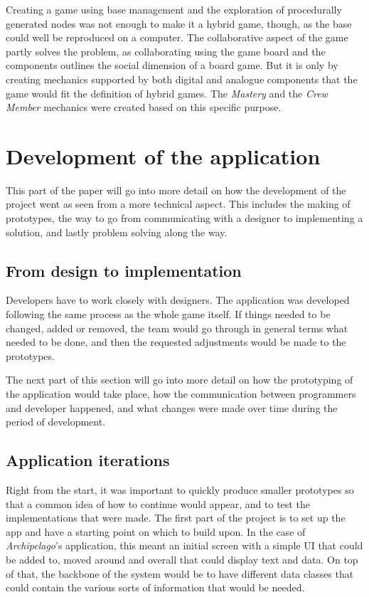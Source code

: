 Creating a game using base management and the exploration of procedurally generated nodes was not enough to make it a hybrid game, though, as the base could well be reproduced on a computer. The collaborative aspect of the game partly solves the problem, as collaborating using the game board and the components outlines the social dimension of a board game. But it is only by creating mechanics supported by both digital and analogue components that the game would fit the definition of hybrid games. The \textit{Mastery} and the \textit{Crew Member} mechanics were created based on this specific purpose.



\section{Development of the application}
This part of the paper will go into more detail on how the development of the project went as seen from a more technical aspect. This includes the making of prototypes, the way to go from communicating with a designer to implementing a solution, and lastly problem solving along the way.

\subsection{From design to implementation}
Developers have to work closely with designers. The application was developed following the same process as the whole game itself. 
If things needed to be changed, added or removed, the team would go through in general terms what needed to be done, and then the requested adjustments would be made to the prototypes.

The next part of this section will go into more detail on how the prototyping of the application would take place, how the communication between programmers and developer happened, and what changes were made over time during the period of development.

\subsection{Application iterations}
Right from the start, it was important to quickly produce smaller prototypes so that a common idea of how to continue would appear, and to test the implementations that were made. The first part of the project is to set up the app and have a starting point on which to build upon. In the case of \textit{Archipelago}'s application, this meant an initial screen with a simple UI that could be added to, moved around and overall that could display text and data. On top of that, the backbone of the system would be to have different data classes that could contain the various sorts of information that would be needed.

